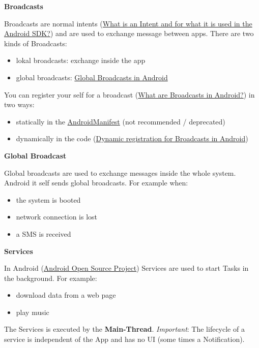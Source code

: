\documentclass[11pt,twoside,landscape]{article}
\begin{document}
\begin{multicols}{3}
\textbf{Broadcasts}

Broadcasts are normal intents (\href{../../../roam/20211002175222-what_is_an_intent_and_for_what_it_is_used_in_the_android_sdk.org}{What is an Intent and for what it is used in the Android SDK?}) and are used to exchange message between apps.
There are two kinds of Broadcasts:
\begin{itemize}
\item lokal broadcasts: exchange inside the app
\item global broadcasts: \href{../../../roam/20211103165118-global_broadcasts_in_android.org}{Global Broadcasts in Android}
\end{itemize}

You can register your self for a broadcast (\href{../../../roam/20211029100710-what_are_broadcasts_in_android.org}{What are Broadcasts in Android?}) in two ways:
\begin{itemize}
\item statically in the \href{../../../roam/20210921175054-androidmanifest.org}{AndroidManifest} (not recommended / deprecated)
\item dynamically in the code (\href{../../../roam/20211103170117-dynamic_registration_for_broadcasts_in_android.org}{Dynamic registration for Broadcasts in Android})
\end{itemize}

\textbf{Global Broadcast}

Global broadcasts are used to exchange messages inside the whole system.
Android it self sends global broadcasts. For example when:
\begin{itemize}
\item the system is booted
\item network connection is lost
\item a SMS is received
\end{itemize}


\textbf{Services}

In Android (\href{../../../roam/20210921143632-aosp.org}{Android Open Source Project}) Services are used to start Tasks in the background.
For example:
\begin{itemize}
\item download data from a web page
\item play music
\end{itemize}


The Services is executed by the \textbf{Main-Thread}.
\emph{Important}: The lifecycle of a service is independent of the App and has no UI (some times a Notification).


\end{multicols}
\end{document}
